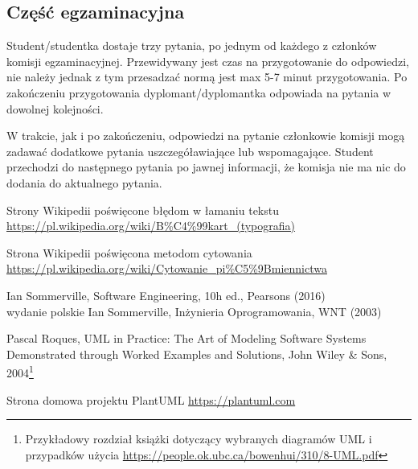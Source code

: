 \documentclass[12pt,a4paper]{article}
\begin{document}
\subsection{Część egzaminacyjna}

Student/studentka dostaje trzy pytania, po jednym od każdego z członków komisji egzaminacyjnej. Przewidywany jest czas na przygotowanie do odpowiedzi, nie należy jednak z tym przesadzać normą jest max 5-7 minut przygotowania. Po zakończeniu przygotowania dyplomant/dyplomantka odpowiada na pytania w dowolnej kolejności.

W trakcie, jak i po zakończeniu, odpowiedzi na pytanie członkowie komisji mogą zadawać dodatkowe pytania uszczegóławiające lub wspomagające. Student przechodzi do następnego pytania po jawnej informacji, że komisja nie ma nic do dodania do aktualnego pytania.




 Strony Wikipedii poświęcone błędom w łamaniu tekstu\\
\url{https://pl.wikipedia.org/wiki/B%C4%99kart_(typografia)}

 Strona Wikipedii poświęcona metodom cytowania \\
\url{https://pl.wikipedia.org/wiki/Cytowanie_pi%C5%9Bmiennictwa}

 Ian Sommerville, Software Engineering, 10h ed., Pearsons  (2016)\\
 wydanie polskie Ian Sommerville, Inżynieria Oprogramowania, WNT (2003)

 Pascal Roques, UML in Practice: The Art of Modeling Software Systems Demonstrated through Worked Examples and Solutions, John Wiley \& Sons, 2004\footnote{Przykładowy rozdział książki dotyczący wybranych diagramów UML i przypadków użycia \url{https://people.ok.ubc.ca/bowenhui/310/8-UML.pdf}}

 Strona domowa projektu PlantUML \url{https://plantuml.com}
\end{document}

